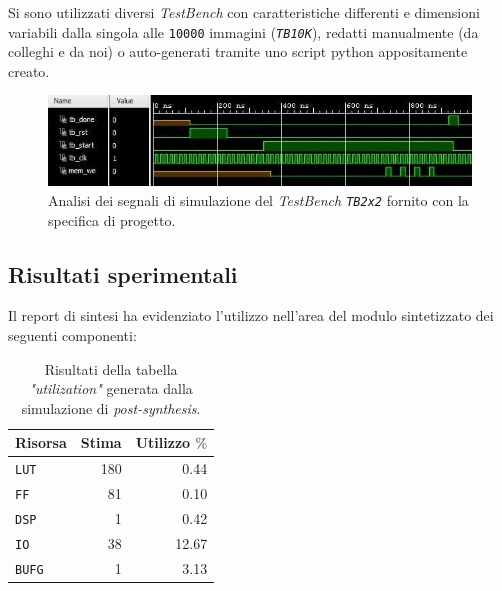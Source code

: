 \documentclass{article}
\begin{document}
Si sono utilizzati diversi \emph{TestBench} con caratteristiche differenti e dimensioni variabili dalla singola alle \texttt{10000} immagini (\emph{\texttt{TB10K}}), redatti manualmente (da colleghi e da noi) o auto-generati tramite uno script python appositamente creato.
\vspace{0,2cm}

\begin{figure}[ht]
    \centering
    \includegraphics[scale=0.8]{./images/2x2.jpg}
    \caption{Analisi dei segnali di simulazione del \emph{TestBench \texttt{TB2x2}} fornito con la specifica di progetto.}
\end{figure}
\vspace{0,2cm}

\clearpage
\pagebreak

\subsection{Risultati sperimentali}
Il report di sintesi ha evidenziato l’utilizzo nell’area del modulo sintetizzato dei seguenti componenti:

\begin{table}[ht]
    \centering
    \small
    \def\arraystretch{1.3} %
    \caption{Risultati della tabella \emph{"utilization"} generata dalla simulazione di \emph{post-synthesis}.}
    \begin{tabular}[width=4cm]{|| l | r | r ||}
        \hline
        Risorsa       & Stima & Utilizzo $\%$\footnotemark \\
        \hline \hline
        \texttt{LUT}  & 180   & 0.44                       \\ \hline
        \texttt{FF}   & 81    & 0.10                       \\ \hline
        \texttt{DSP}  & 1     & 0.42                       \\ \hline
        \texttt{IO}   & 38    & 12.67                      \\ \hline
        \texttt{BUFG} & 1     & 3.13                       \\ \hline
    \end{tabular}
\end{table}
\vspace{0,2cm}
\end{document}
